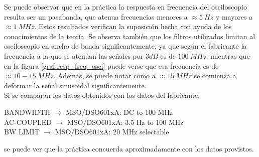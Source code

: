 \documentclass[a4paper]{article}
\begin{document}
Se puede observar que en la práctica la respuesta en frecuencia del osciloscopio resulta ser un pasabanda, que atenua frecuencias menores a $\approx 5 \ Hz$ y mayores a $\approx 1 \ MHz$. Estos resultados verifican la suposición hecha con ayuda de los conocimientos de la teoría. Se observa también que los filtros utilizados limitan al osciloscopio en ancho de banda significantemente, ya que según el fabricante la frecuencia a la que se atenúan las señales por $3dB$ es de $100 \ MHz$, mientras que en la figura \ref{graf:resp_freq_osci} puede verse que esa frecuencia es de $\approx 10-15 \ MHz$. Además, se puede notar como a $\approx 15 \ MHz$ se comienza a deformar la señal sinusoidal significantemente.\\

Si se comparan los datos obtenidos con los datos del fabricante:
\begin{center}
BANDWIDTH $\rightarrow$ MSO/DSO601xA: DC to 100 MHz\\
AC-COUPLED $\rightarrow$ MSO/DSO601xA: 3.5 Hz to 100 MHz\\
BW LIMIT $\rightarrow$ MSO/DSO601xA: 20 MHz selectable\\
\end{center}
se puede ver que la práctica concuerda aproximadamente con los datos provistos.
\end{document}
